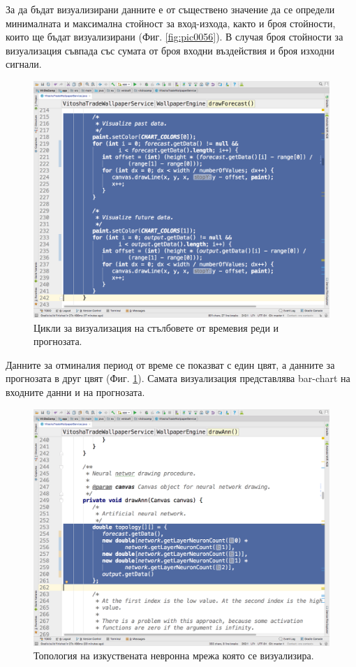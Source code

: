 \documentclass[book,14pt,oneside,openany]{memoir}
\begin{document}
За да бъдат визуализирани данните е от съществено значение да се определи минималната и максимална стойност за вход-изхода, както и броя стойности, които ще бъдат визуализирани (Фиг. \ref{fig:pic0056}). В случая броя стойности за визуализация съвпада със сумата от броя входни въздействия и броя изходни сигнали. 

\begin{figure}[h]
  \centering
  \includegraphics[height=0.45\pdfpageheight]{./images/pic0057.png}
  \caption{Цикли за визуализация на стълбовете от времевия реди и прогнозата.}
\label{fig:pic0057}
\end{figure}
\FloatBarrier

Данните за отминалия период от време се показват с един цвят, а данните за прогнозата в друг цвят (Фиг. \ref{fig:pic0057}). Самата визуализация представлява bar-chart на входните данни и на прогнозата. 

\begin{figure}[h]
  \centering
  \includegraphics[height=0.45\pdfpageheight]{./images/pic0058.png}
  \caption{Топология на изкуствената невронна мрежа която се визуализира.}
\label{fig:pic0058}
\end{figure}
\FloatBarrier
\end{document}
